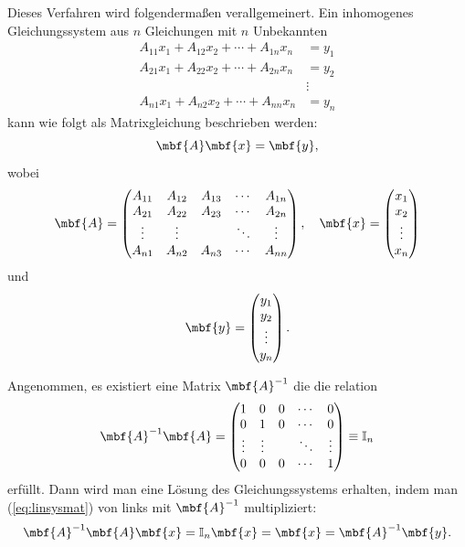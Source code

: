 Dieses Verfahren wird folgendermaßen verallgemeinert. Ein inhomogenes Gleichungssystem aus $n$ Gleichungen mit $n$ Unbekannten 
\begin{equation}
	\begin{split}
		A_{11} x_1 + A_{12} x_2 + \cdots + A_{1n}x_n &= y_1 \\
		A_{21} x_1 + A_{22} x_2 + \cdots + A_{2n}x_n &= y_2 \\
		&\vdots  \\
		A_{n1} x_1 + A_{n2} x_2 + \cdots + A_{nn}x_n &= y_n 
	\end{split}
\end{equation}
kann wie folgt als Matrixgleichung beschrieben werden:
\begin{equation}\label{eq:linsysmat}
	\mbf{A}\mbf{x} = \mbf{y},
\end{equation}
wobei
\begin{equation}
	\mbf{A} = \begin{pmatrix}
		A_{11} & A_{12} & A_{13} & \cdots & A_{1n} \\
		A_{21} & A_{22} & A_{23} & \cdots & A_{2n} \\
		\vdots & \vdots & &  \ddots  & \vdots \\
		A_{n1} & A_{n2} & A_{n3} & \cdots & A_{nn} \\
	\end{pmatrix}, \quad \mbf{x} = \begin{pmatrix}
		x_1 \\ x_2 \\ \vdots \\ x_n
	\end{pmatrix}
\end{equation}
und
\begin{equation}
	\mbf{y} = \begin{pmatrix}
		y_1 \\ y_2 \\ \vdots \\ y_n
	\end{pmatrix}.
\end{equation}

Angenommen, es existiert eine Matrix $\mbf{A}^{-1}$ die die relation
\begin{equation}
	\mbf{A}^{-1} \mbf{A} = \begin{pmatrix}
		1 & 0 & 0 & \cdots & 0 \\
		0 & 1 & 0 & \cdots & 0 \\
		\vdots & \vdots & &  \ddots  & \vdots \\
		0 & 0 & 0 & \cdots & 1
	\end{pmatrix} \equiv \mathbb{I}_n
\end{equation}
erfüllt. Dann wird man eine Lösung des Gleichungssystems erhalten, indem man (\ref{eq:linsysmat}) von links mit $\mbf{A}^{-1}$ multipliziert:
\begin{equation}
 	\mbf{A}^{-1}\mbf{A}\mbf{x} = \mathbb{I}_n \mbf{x} = \mbf{x} = \mbf{A}^{-1}\mbf{y}.
\end{equation} 

